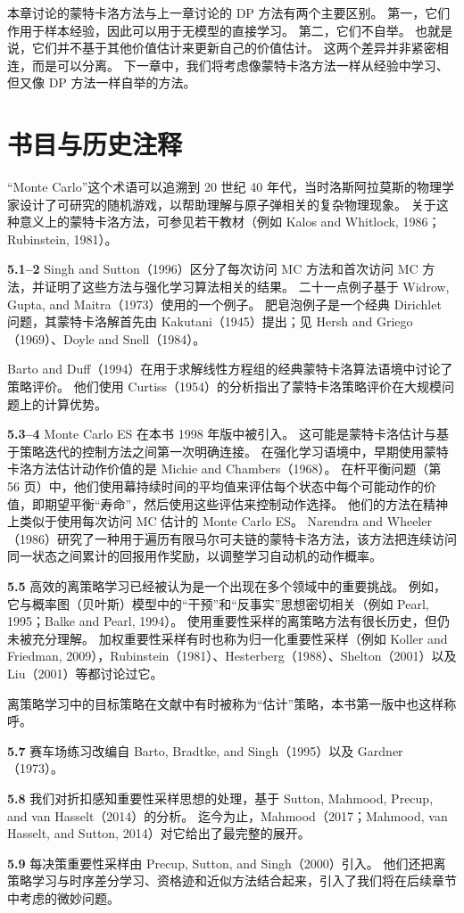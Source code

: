 \documentclass[UTF8,12pt,a4paper,fontset=fandol]{ctexart}
\begin{document}
本章讨论的蒙特卡洛方法与上一章讨论的 DP 方法有两个主要区别。
第一，它们作用于样本经验，因此可以用于无模型的直接学习。
第二，它们不自举。
也就是说，它们并不基于其他价值估计来更新自己的价值估计。
这两个差异并非紧密相连，而是可以分离。
下一章中，我们将考虑像蒙特卡洛方法一样从经验中学习、但又像 DP 方法一样自举的方法。

\section*{书目与历史注释}

“Monte Carlo”这个术语可以追溯到 20 世纪 40 年代，当时洛斯阿拉莫斯的物理学家设计了可研究的随机游戏，以帮助理解与原子弹相关的复杂物理现象。
关于这种意义上的蒙特卡洛方法，可参见若干教材（例如 Kalos and Whitlock, 1986；Rubinstein, 1981）。

\noindent\textbf{5.1--2}
Singh and Sutton（1996）区分了每次访问 MC 方法和首次访问 MC 方法，并证明了这些方法与强化学习算法相关的结果。
二十一点例子基于 Widrow, Gupta, and Maitra（1973）使用的一个例子。
肥皂泡例子是一个经典 Dirichlet 问题，其蒙特卡洛解首先由 Kakutani（1945）提出；见 Hersh and Griego（1969）、Doyle and Snell（1984）。

Barto and Duff（1994）在用于求解线性方程组的经典蒙特卡洛算法语境中讨论了策略评价。
他们使用 Curtiss（1954）的分析指出了蒙特卡洛策略评价在大规模问题上的计算优势。

\noindent\textbf{5.3--4}
Monte Carlo ES 在本书 1998 年版中被引入。
这可能是蒙特卡洛估计与基于策略迭代的控制方法之间第一次明确连接。
在强化学习语境中，早期使用蒙特卡洛方法估计动作价值的是 Michie and Chambers（1968）。
在杆平衡问题（第 56 页）中，他们使用幕持续时间的平均值来评估每个状态中每个可能动作的价值，即期望平衡“寿命”，然后使用这些评估来控制动作选择。
他们的方法在精神上类似于使用每次访问 MC 估计的 Monte Carlo ES。
Narendra and Wheeler（1986）研究了一种用于遍历有限马尔可夫链的蒙特卡洛方法，该方法把连续访问同一状态之间累计的回报用作奖励，以调整学习自动机的动作概率。

\noindent\textbf{5.5}
高效的离策略学习已经被认为是一个出现在多个领域中的重要挑战。
例如，它与概率图（贝叶斯）模型中的“干预”和“反事实”思想密切相关（例如 Pearl, 1995；Balke and Pearl, 1994）。
使用重要性采样的离策略方法有很长历史，但仍未被充分理解。
加权重要性采样有时也称为归一化重要性采样（例如 Koller and Friedman, 2009），Rubinstein（1981）、Hesterberg（1988）、Shelton（2001）以及 Liu（2001）等都讨论过它。

离策略学习中的目标策略在文献中有时被称为“估计”策略，本书第一版中也这样称呼。

\noindent\textbf{5.7}
赛车场练习改编自 Barto, Bradtke, and Singh（1995）以及 Gardner（1973）。

\noindent\textbf{5.8}
我们对折扣感知重要性采样思想的处理，基于 Sutton, Mahmood, Precup, and van Hasselt（2014）的分析。
迄今为止，Mahmood（2017；Mahmood, van Hasselt, and Sutton, 2014）对它给出了最完整的展开。

\noindent\textbf{5.9}
每决策重要性采样由 Precup, Sutton, and Singh（2000）引入。
他们还把离策略学习与时序差分学习、资格迹和近似方法结合起来，引入了我们将在后续章节中考虑的微妙问题。
\end{document}
